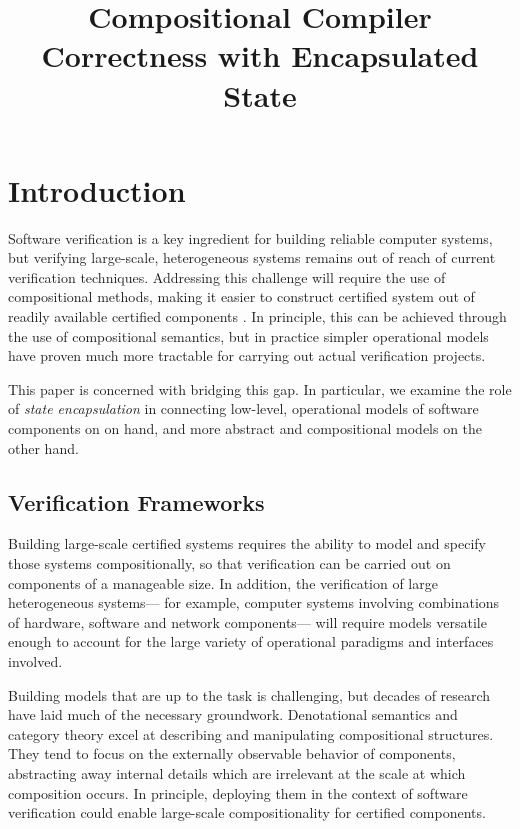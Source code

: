 \documentclass[acmsmall,screen,review,anonymous]{acmart}
\title{Compositional Compiler Correctness with Encapsulated State}
\begin{document}
\maketitle

\section{Introduction} \label{sec:intro} %

Software verification is a key ingredient
for building reliable computer systems,
but verifying large-scale, heterogeneous systems
remains out of reach of current verification techniques.
Addressing this challenge
will require the use of compositional methods,
making it easier to construct certified system
out of readily available certified components
\cite{deepspec}.
In principle,
this can be achieved through the use of
compositional semantics,
but in practice
simpler operational models
have proven much more tractable
for carrying out actual verification projects.

This paper is concerned with bridging this gap.
In particular,
we examine the role of \emph{state encapsulation}
in connecting low-level, operational models
of software components on on hand,
and more abstract and compositional models
on the other hand.

\subsection{Verification Frameworks}

Building large-scale certified systems
requires the ability
to model and specify those systems compositionally,
so that verification can be carried out
on components of a manageable size.
In addition,
the verification of large heterogeneous systems---%
for example,
computer systems involving combinations of
hardware, software and network components---%
will require models versatile enough
to account for the large variety of
operational paradigms and interfaces involved.

Building models that are up to the task is challenging,
but decades of research have laid much of the necessary groundwork.
Denotational semantics and category theory
excel at describing and manipulating compositional structures.
They tend to focus on the externally observable behavior of components,
abstracting away internal details which are irrelevant
at the scale at which composition occurs.
In principle,
deploying them in the context of software verification
could enable large-scale compositionality
for certified components.
\end{document}
